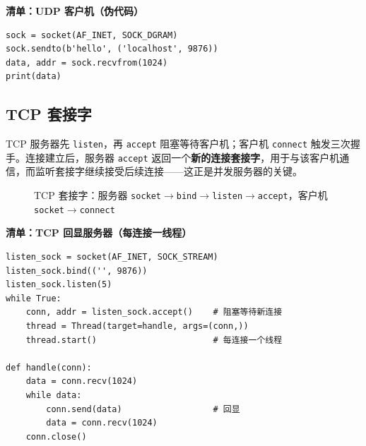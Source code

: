 \noindent\textbf{清单：UDP 客户机（伪代码）}
\begin{lstlisting}
sock = socket(AF_INET, SOCK_DGRAM)
sock.sendto(b'hello', ('localhost', 9876))
data, addr = sock.recvfrom(1024)
print(data)
\end{lstlisting}

\subsection{TCP 套接字}

TCP 服务器先 \texttt{listen}，再 \texttt{accept} 阻塞等待客户机；客户机 \texttt{connect} 触发三次握手。连接建立后，服务器 \texttt{accept} 返回一个\textbf{新的连接套接字}，用于与该客户机通信，而监听套接字继续接受后续连接——这正是并发服务器的关键。

\begin{figure}[H]
\centering
{}
\caption{TCP 套接字：服务器 \texttt{socket}$\to$\texttt{bind}$\to$\texttt{listen}$\to$\texttt{accept}，客户机 \texttt{socket}$\to$\texttt{connect}}
\label{fig:socket_tcp}
\end{figure}

\noindent\textbf{清单：TCP 回显服务器（每连接一线程）}
\begin{lstlisting}
listen_sock = socket(AF_INET, SOCK_STREAM)
listen_sock.bind(('', 9876))
listen_sock.listen(5)
while True:
    conn, addr = listen_sock.accept()    # 阻塞等待新连接
    thread = Thread(target=handle, args=(conn,))
    thread.start()                       # 每连接一个线程

def handle(conn):
    data = conn.recv(1024)
    while data:
        conn.send(data)                  # 回显
        data = conn.recv(1024)
    conn.close()
\end{lstlisting}

